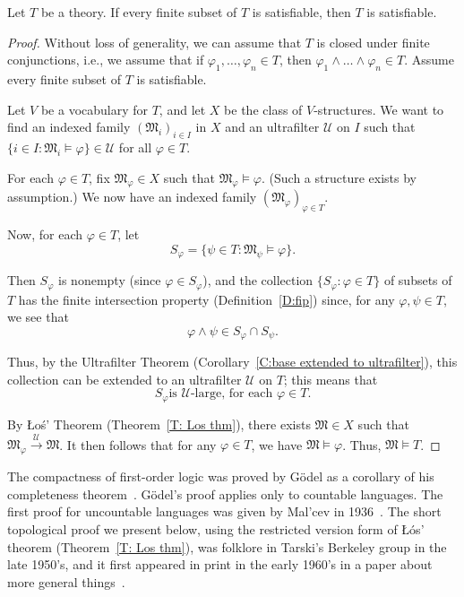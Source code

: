\documentclass{scrartcl}
\renewcommand{\phi}{\varphi}
\newcommand{\FM}{\mathfrak{M}}
\begin{document}
\begin{theorem}
\label{T:compactness}
Let $T$ be a theory. If every finite subset of $T$ is satisfiable, then $T$ is satisfiable.
\end{theorem}




\begin{proof}
Without loss of generality, we can assume that $T$ is closed under finite conjunctions, i.e., we assume that if $\phi_1,\dots, \phi_n\in T$, then $\phi_1\land \dots \land\phi_n\in T$. Assume every finite subset of $T$ is satisfiable.


Let $V$ be a vocabulary for $T$, and let $X$ be the class of $V$-structures. We want to find an indexed family $(\FM_i)_{i\in I}$ in $X$ and an ultrafilter $\mathscr{U}$ on $I$ such that $\{i\in I\colon \FM_i\models \phi\}\in\mathscr{U}$ for all $\phi \in T$.

For each $\phi\in T$, fix $\FM_\phi\in X$ such that $\FM_\phi\models\phi$. (Such a structure exists by assumption.) We now have an indexed family $(\FM_\phi)_{\phi\in T}$.

Now, for each $\phi\in T$, let
\[
S_\phi = 
\{ \psi\in T \colon \FM_\psi\models\phi \}.
\]

Then $S_\phi$ is nonempty (since $\phi \in S_\phi$), and
the collection $\{S_\phi \colon \phi \in T\}$ of subsets of $T$ has the finite intersection property (Definition~\ref{D:fip}) since, for any $\phi,\psi\in T$, we see that 
\[
\phi\wedge\psi\in S_\phi\cap S_\psi.
\]

Thus, by the Ultrafilter Theorem (Corollary~\ref{C:base extended to ultrafilter}), this collection can be extended to an ultrafilter $\mathscr{U}$ on $T$; this means that
\[
\text{$S_\phi$
is $\mathscr{U}$-large, for each $\phi\in T$}.
\]

By \L o\'s' Theorem (Theorem~\ref{T: Los thm}), there exists $\FM\in X$ such that $\FM_\phi\overset{\mathscr{U}}\to\FM$. It then follows that for any $\phi \in T$, we have $\mathfrak{M}\models \varphi$. Thus, $\mathfrak{M}\models T$.
\end{proof}



\begin{history}
The compactness of first-order logic was proved by Gödel as a corollary of his completeness theorem~\cite{Godel:1930}. Gödel's proof applies only to countable languages. The first proof for uncountable languages was given by Mal'cev in 1936~\cite{Malcev:1936}. The short topological proof we present below, using the restricted version form of Ł\'{o}s' theorem (Theorem~\ref{T: Los thm}), was folklore in Tarski's Berkeley group in the late 1950's, and it first appeared in print in the early 1960's in a paper about more general things~\cite{Frayne-Morel-Scott:1962}. 
\end{history}
\end{document}
